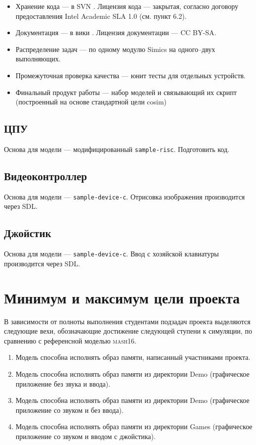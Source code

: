 \begin{itemize}
\item Хранение кода --- в SVN . Лицензия кода --- закрытая, согласно договору предоставления Intel Academic SLA 1.0 (см. пункт 6.2). 

\item Документация --- в вики . Лицензия документации --- CC BY-SA.

\item Распределение задач --- по одному модулю Simics на одного--двух выполняющих.
\item Промежуточная проверка качества --- юнит тесты для отдельных устройств.
\item Финальный продукт работы --- набор моделей и связывающий их скрипт (построенный на основе стандартной цели cosim)
\end{itemize}

\subsection{ЦПУ}

Основа для модели --- модифицированный \texttt{sample-risc}. \todo Подготовить код.

\subsection{Видеоконтроллер}

Основа для модели --- \texttt{sample-device-c}. Отрисовка изображения производится через SDL.

\subsection{Джойстик}

Основа для модели --- \texttt{sample-device-c}. Ввод с хозяйской клавиатуры производится через SDL.

\section{Минимум и максимум цели проекта}

В зависимости от полноты выполнения студентами подзадач проекта выделяются следующие вехи, обозначающие достижение следующей ступени к симуляции, по сравнению с референсной моделью \textsc{mash16}.

\begin{enumerate}
    \item Модель способна исполнять образ памяти, написанный участниками проекта.
    \item Модель способна исполнять образ памяти из директории Demo (графическое приложение без звука и ввода).
    \item Модель способна исполнять образ памяти из директории Demo (графическое приложение со звуком и без ввода).
    \item Модель способна исполнять образ памяти из директории Games (графическое приложение со звуком и вводом с джойстика).
\end{enumerate}

